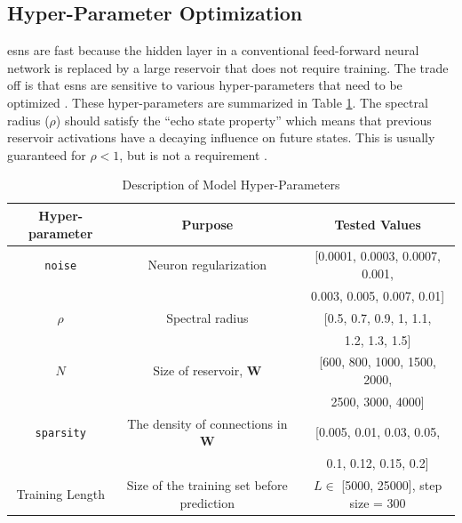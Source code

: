  \subsection{Hyper-Parameter Optimization}

 \glspl{esn} are fast because the hidden layer in a conventional feed-forward neural network is replaced by a large reservoir that does not require training.
 The trade off is that \glspl{esn} are sensitive to various hyper-parameters
 that need to be optimized \cite{lukosevicius_practical_2012}. These hyper-parameters are summarized in Table \ref{tab:parameters}. The spectral radius ($\rho$) should satisfy the ``echo state property'' which means that
 previous reservoir activations have a decaying influence on future states. This
 is usually guaranteed for $\rho < 1$, but is not a requirement
 \cite{lukosevicius_practical_2012}.
 \begin{table}[h]
   \centering
   \caption{Description of Model Hyper-Parameters}
   \begin{tabular}{c|c|c}
     \hline
     Hyper-parameter & Purpose & Tested Values\\
     \hline
     \texttt{noise} & Neuron regularization & [0.0001, 0.0003, 0.0007, 0.001, \\
     &&0.003, 0.005, 0.007, 0.01]\\
     $\rho$ & Spectral radius & [0.5, 0.7, 0.9, 1, 1.1, \\
     &&1.2, 1.3, 1.5]\\
     $N$ & Size of reservoir, \textbf{W} & [600, 800, 1000, 1500, 2000, \\
     &&2500, 3000, 4000]\\
     \texttt{sparsity} & The density of connections in \textbf{W}& [0.005, 0.01, 0.03, 0.05, \\
     &&0.1, 0.12, 0.15, 0.2]\\
     Training Length & Size of the training set before prediction & $L \in$ [5000, 25000], step size = 300
   \end{tabular}
   \label{tab:parameters}
 \end{table}

